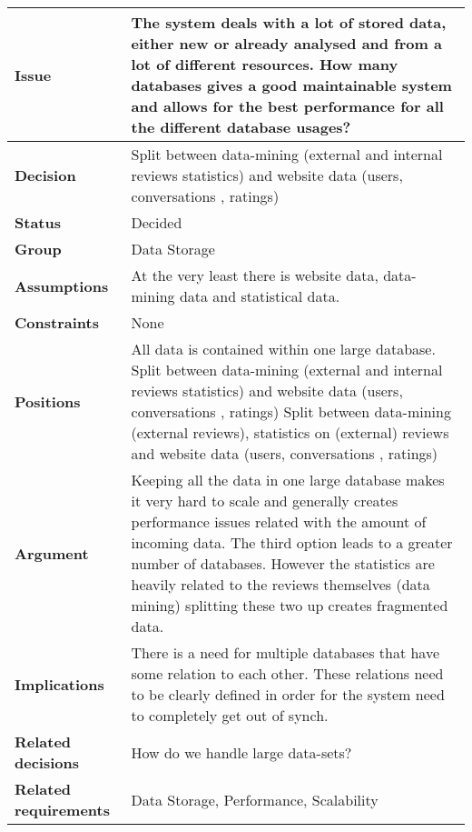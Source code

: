 
\begin{tabular}{ l  p{10cm}}
\hline
\bf Issue & The system deals with a lot of stored data, either new or already analysed and from a lot of different resources. How many databases gives a good maintainable system and allows for the best performance for all the different database usages?\\
\hline
\bf Decision & Split between data-mining (external and internal reviews statistics) and website data (users, conversations , ratings)\\
\hline
\bf Status & Decided\\
\hline
\bf Group & Data Storage \\
\hline
\bf Assumptions & At the very least there is website data, data-mining data and statistical data.\\
\hline
\bf Constraints & None \\
\hline
\bf Positions & All data is contained within one large database. \newline\newline
Split between data-mining (external and internal reviews statistics) and website data (users, conversations , ratings)  \newline\newline
Split between data-mining (external reviews), statistics on (external) reviews and website data (users, conversations , ratings)
 \\
\hline
\bf Argument & Keeping all the data in one large database makes it very hard to scale and generally creates performance issues related with the amount of incoming data. 
The third option leads to a greater number of databases. However the statistics are heavily related to the reviews themselves (data mining) splitting these two up creates fragmented data. 
 \\
\hline
\bf Implications & There is a need for multiple databases that have some relation to each other. These relations need to be clearly defined in order for the system need to completely get out of synch. \\
\hline
\bf Related decisions & How do we handle large data-sets? \\
\hline
\bf Related requirements  & Data Storage, Performance, Scalability\\
\hline
\end{tabular}
